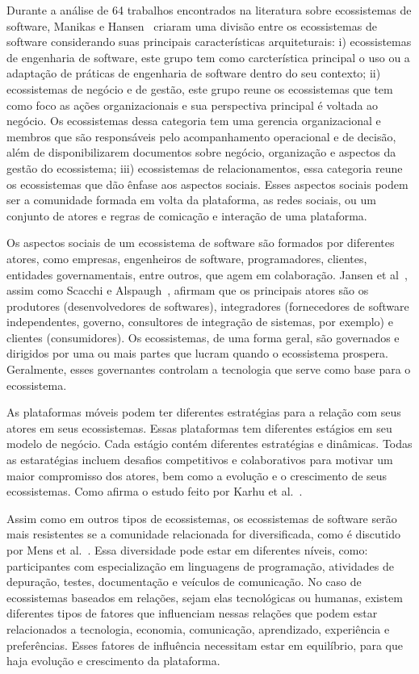 \documentclass[conference]{IEEEtran}
\begin{document}
Durante a análise de 64 trabalhos encontrados na literatura sobre ecossistemas de software, Manikas e Hansen~\cite{Manikas2013} criaram uma divisão entre os ecossistemas de software considerando suas principais características arquiteturais: i) ecossistemas de engenharia de software, este grupo tem como carcterística principal o uso ou a adaptação de práticas de engenharia de software dentro do seu contexto; ii) ecossistemas de negócio e de gestão, este grupo reune os ecossistemas que tem como foco as ações organizacionais e sua perspectiva principal é voltada ao negócio. Os ecossistemas dessa categoria tem uma gerencia organizacional e membros que são responsáveis pelo acompanhamento operacional e de decisão, além de disponibilizarem documentos sobre negócio, organização e aspectos da gestão do ecossistema; iii) ecossistemas de relacionamentos, essa categoria reune os ecossistemas que dão ênfase aos aspectos sociais. Esses aspectos sociais podem ser a comunidade formada em volta da plataforma, as redes sociais, ou um conjunto de atores e regras de comicação e interação de uma plataforma.

Os aspectos sociais de um ecossistema de software são formados por diferentes atores, como empresas, engenheiros de software, programadores, clientes, entidades governamentais, entre outros, que agem em colaboração. Jansen et al~\cite{Jansen2013}, assim como Scacchi e Alspaugh~\cite{Scacchi2012}, afirmam que os principais atores são os produtores (desenvolvedores de softwares), integradores (fornecedores de software independentes, governo, consultores de integração de sistemas, por exemplo) e clientes (consumidores). Os ecossistemas, de uma forma geral, são governados e dirigidos por uma ou mais partes que lucram quando o ecossistema prospera. Geralmente, esses governantes controlam a tecnologia que serve como base para o ecossistema.

As plataformas móveis podem ter diferentes estratégias para a relação com seus atores em seus ecossistemas. Essas plataformas tem diferentes estágios em seu modelo de negócio. Cada estágio contém diferentes estratégias e dinâmicas. Todas as estaratégias incluem desafios competitivos e colaborativos para motivar um maior compromisso dos atores, bem como a evolução e o crescimento de seus ecossistemas. Como afirma o estudo feito por Karhu et al.~\cite{Karhu2009}. 

Assim como em outros tipos de ecossistemas, os ecossistemas de software serão mais resistentes se a comunidade relacionada for diversificada, como é discutido por Mens et al.~\cite{Mens2014}. Essa diversidade pode estar em diferentes níveis, como: participantes com especialização em linguagens de programação, atividades de depuração, testes, documentação e veículos de comunicação. No caso de ecossistemas baseados em relações, sejam elas tecnológicas ou humanas, existem diferentes tipos de fatores que influenciam nessas relações que podem estar relacionados a tecnologia, economia, comunicação, aprendizado, experiência e preferências. Esses fatores de influência necessitam estar em equilíbrio, para que haja evolução e crescimento da plataforma. 
\end{document}
